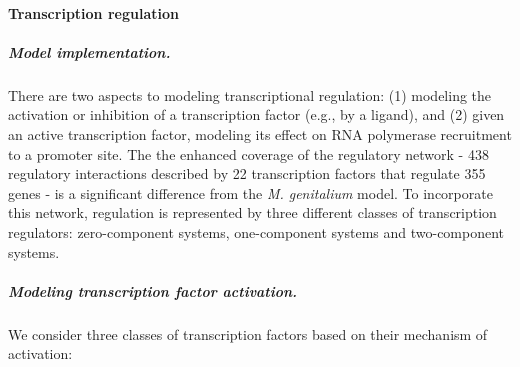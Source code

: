 \documentclass[12pt]{article}
\begin{document}
\baselineskip24pt

\paragraph{Transcription regulation}
\label{sec:transcription_reg}

\subparagraph{Model implementation.}
There are two aspects to modeling transcriptional regulation: (1) modeling the activation or inhibition of a transcription factor (e.g., by a ligand), and (2) given an active transcription factor, modeling its effect on RNA polymerase recruitment to a promoter site.  The the enhanced coverage of the regulatory network - 438 regulatory interactions described by 22 transcription factors that regulate 355 genes - is a significant difference from the \emph{M. genitalium} model. To incorporate this network, regulation is represented by three different classes of transcription regulators: zero-component systems, one-component systems and two-component systems.

\subparagraph{Modeling transcription factor activation.}
We consider three classes of transcription factors based on their mechanism of activation:
\end{document}
